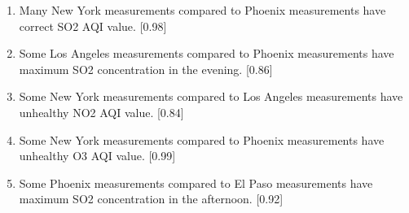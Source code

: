 \documentclass{classrep}
\begin{document}
{{\begin{enumerate}
                \item Many New York measurements compared to Phoenix measurements have correct SO2 AQI value. [0.98]
                \item Some Los Angeles measurements compared to Phoenix measurements have maximum SO2 concentration in the evening. [0.86]
                \item Some New York measurements compared to Los Angeles measurements have unhealthy NO2 AQI value. [0.84]
                \item Some New York measurements compared to Phoenix measurements have unhealthy O3 AQI value. [0.99]
                \item Some Phoenix measurements compared to El Paso measurements have maximum SO2 concentration in the afternoon. [0.92]
            \end{enumerate}
        }
        
}
\end{document}
